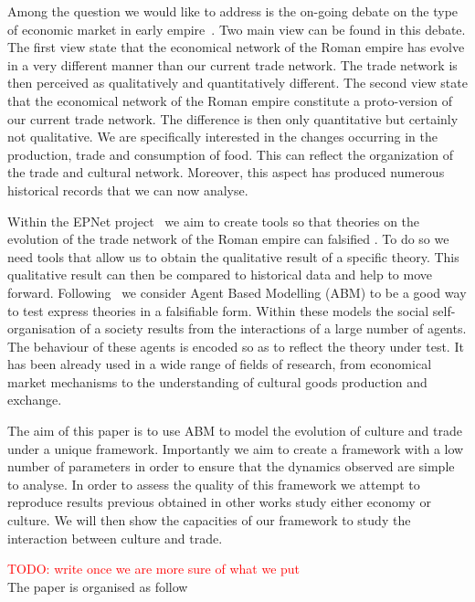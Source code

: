 \documentclass{wscpaperproc}
\newcommand{\memo}[2]{\textcolor{#1}{#2}}
\newcommand{\todo}[1]{\memo{red}{TODO: #1\\}}
\begin{document}
Among the question we would like to address is the on-going debate on the type of economic market in early empire~\cite{polanyi_trade_1957}. Two main view can be found in this debate. The first view state that the economical network of the Roman empire has evolve in a very different manner than our current trade network. The trade network is then perceived as qualitatively and quantitatively different. The second view state that the economical network of the Roman empire constitute a proto-version of our current trade network. The difference is then only quantitative but certainly not qualitative. We are specifically interested in the changes occurring in the production, trade and consumption of food. This can reflect the organization of the trade and cultural network. Moreover, this aspect has produced numerous historical records that we can now analyse.

Within the EPNet project~\cite{remesal_epnet_2014} we aim to create tools so that theories on the evolution of the trade network of the Roman empire can falsified . To do so we need tools that allow us to obtain the qualitative result of a specific theory. This qualitative result can then be compared to historical data and help to move forward. Following~\cite{epstein_growing_1996,lake_trends_2014,kohler_dynamics_2000,tesfatsion_agent-based_2003,epstein_why_2008} we consider Agent Based Modelling (ABM) to be a good way to test express theories in a falsifiable form. Within these models the social self-organisation of a society results from the interactions of a large number of agents. The behaviour of these agents is encoded so as to reflect the theory under test. It has been already used in a wide range of fields of research, from economical market mechanisms to the understanding of cultural goods production and exchange.

The aim of this paper is to use ABM to model the evolution of culture and trade under a unique framework. Importantly we aim to create a framework with a low number of parameters in order to ensure that the dynamics observed are simple to analyse. In order to assess the quality of this framework we attempt to reproduce results previous obtained in other works study either economy or culture. We will then show the capacities of our framework to study the interaction between culture and trade.

\todo{write once we are more sure of what we put}
The paper is organised as follow
\end{document}
